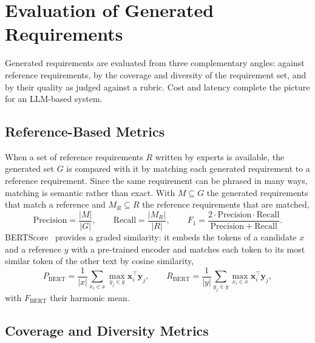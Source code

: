 \section{Evaluation of Generated Requirements}
\label{sec:bg-metrics}

Generated requirements are evaluated from three complementary angles: against reference requirements, by the coverage and diversity of the requirement set, and by their quality as judged against a rubric. Cost and latency complete the picture for an LLM-based system.

\subsection{Reference-Based Metrics}
\label{sec:bg-metrics-reference}

When a set of reference requirements $R$ written by experts is available, the generated set $G$ is compared with it by matching each generated requirement to a reference requirement. Since the same requirement can be phrased in many ways, matching is semantic rather than exact. With $M \subseteq G$ the generated requirements that match a reference and $M_R \subseteq R$ the reference requirements that are matched,
\begin{equation}
    \mathrm{Precision} = \frac{|M|}{|G|}, \qquad
    \mathrm{Recall} = \frac{|M_R|}{|R|}, \qquad
    F_1 = \frac{2 \cdot \mathrm{Precision} \cdot \mathrm{Recall}}{\mathrm{Precision} + \mathrm{Recall}}.
\end{equation}
BERTScore~\cite{zhang2020bertscore} provides a graded similarity: it embeds the tokens of a candidate $x$ and a reference $y$ with a pre-trained encoder and matches each token to its most similar token of the other text by cosine similarity,
\begin{equation}
    P_{\mathrm{BERT}} = \frac{1}{|x|}\sum_{x_i \in x} \max_{y_j \in y} \mathbf{x}_i^\top \mathbf{y}_j, \qquad
    R_{\mathrm{BERT}} = \frac{1}{|y|}\sum_{y_j \in y} \max_{x_i \in x} \mathbf{x}_i^\top \mathbf{y}_j,
\end{equation}
with $F_{\mathrm{BERT}}$ their harmonic mean.

\subsection{Coverage and Diversity Metrics}
\label{sec:bg-metrics-diversity}


